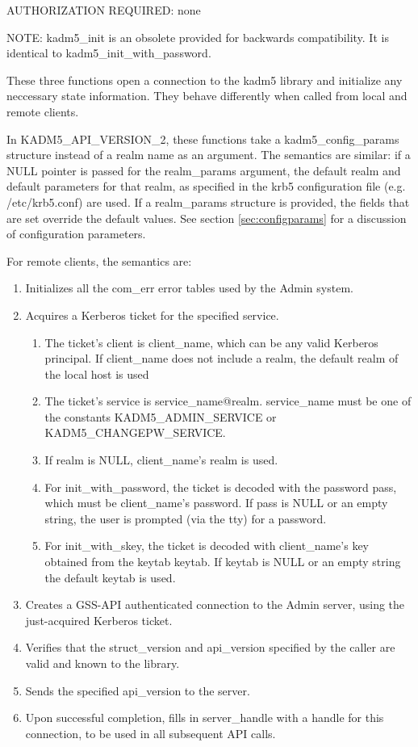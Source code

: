 AUTHORIZATION REQUIRED: none

NOTE: kadm5_init is an obsolete provided for backwards
compatibility.  It is identical to kadm5_init_with_password.

These three functions open a connection to the kadm5 library and
initialize any neccessary state information.  They behave differently
when called from local and remote clients.  

In KADM5_API_VERSION_2, these functions take a kadm5_config_params
structure instead of a realm name as an argument.  The semantics are
similar: if a NULL pointer is passed for the realm_params argument,
the default realm and default parameters for that realm, as specified
in the krb5 configuration file (e.g. /etc/krb5.conf) are used.  If a
realm_params structure is provided, the fields that are set override
the default values.  See section \ref{sec:configparams} for a
discussion of configuration parameters.

For remote clients, the semantics are:

\begin{enumerate}
\item Initializes all the com_err error tables used by the Admin
system.

\item Acquires a Kerberos ticket for the specified service.

\begin{enumerate}
\item The ticket's client is client_name, which can be any valid
Kerberos principal.  If client_name does not include a realm, the
default realm of the local host is used
\item The ticket's service is service_name@realm.  service_name must
be one of the constants KADM5_ADMIN_SERVICE or
KADM5_CHANGEPW_SERVICE.
\item If realm is NULL, client_name's realm is used.

\item For init_with_password, the ticket is decoded with the password
pass, which must be client_name's password.  If pass is NULL or an
empty string, the user is prompted (via the tty) for a password.

\item For init_with_skey, the ticket is decoded with client_name's key
obtained from the keytab keytab.  If keytab is NULL or an empty string
the default keytab is used.
\end{enumerate}

\item Creates a GSS-API authenticated connection to the Admin server,
using the just-acquired Kerberos ticket.

\item Verifies that the struct_version and api_version specified by
the caller are valid and known to the library.

\item Sends the specified api_version to the server.

\item Upon successful completion, fills in server_handle with a handle
for this connection, to be used in all subsequent API calls.
\end{enumerate}

